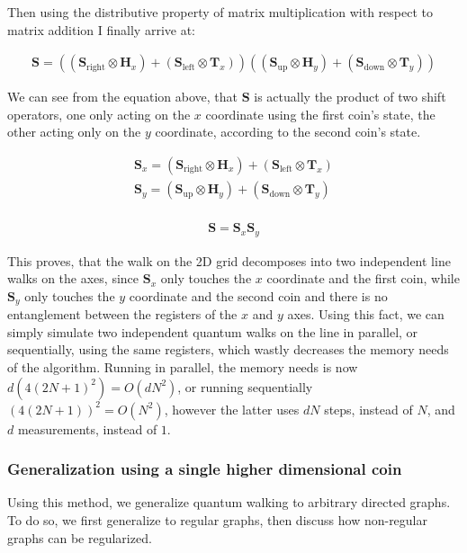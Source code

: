 Then using the distributive property of matrix multiplication with respect to matrix addition I finally arrive at:

\begin{align*} 
    \mathbf{S} =   
    ((\mathbf{S}_{\text{right}} \otimes \mathbf{H}_x) + (\mathbf{S}_{\text{left}} \otimes \mathbf{T}_x))
    ((\mathbf{S}_{\text{up}} \otimes \mathbf{H}_y) + (\mathbf{S}_{\text{down}} \otimes \mathbf{T}_y))
\end{align*}

We can see from the equation above, that $\mathbf{S}$ is actually the product of two shift operators, one only
acting on the $x$ coordinate using the first coin's state, the other acting only on the $y$ coordinate, according to the second
coin's state.

\begin{align*} 
    \mathbf{S}_x = (\mathbf{S}_{\text{right}} \otimes \mathbf{H}_x) + (\mathbf{S}_{\text{left}} \otimes \mathbf{T}_x) \\
    \mathbf{S}_y = (\mathbf{S}_{\text{up}} \otimes \mathbf{H}_y) + (\mathbf{S}_{\text{down}} \otimes \mathbf{T}_y) \\
\end{align*}    

\begin{align*}
    \mathbf{S} = \mathbf{S}_x\mathbf{S}_y
\end{align*}

This proves, that the walk on the 2D grid decomposes into two independent line walks on the axes, since $\mathbf{S}_x$ only touches the $x$ coordinate and the first coin, while $\mathbf{S}_y$ only touches the $y$ coordinate and the second coin and there is no entanglement between the registers of the $x$ and $y$ axes. Using this fact, we can simply simulate two independent quantum walks on the line in parallel, or sequentially, using the same registers, which wastly decreases the memory needs of the algorithm. Running in parallel, the memory needs is now $d(4(2N+1)^2) = O(dN^2)$, or running sequentially $(4(2N+1))^2 = O(N^2)$, however the latter uses $dN$ steps, instead of $N$, and $d$ measurements, instead of $1$.

\subsubsection{Generalization using a single higher dimensional coin}

Using this method, we generalize quantum walking to arbitrary directed graphs. To do so, we first generalize to regular graphs, then discuss how non-regular graphs can be regularized.

